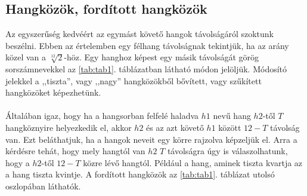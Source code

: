 \subsection{Hangközök, fordított hangközök}
\label{sec:hangkozok}
Az egyszerűség kedvéért az egymást követő  hangok távolságáról szoktunk beszélni. 
Ebben az értelemben egy félhang távolságnak tekintjük, ha az arány közel van a $\sqrt[12]{2}$-höz. 
Egy hanghoz képest egy másik távolságát görög sorszámnevekkel az \ref{tab:tab1}. 
táblázatban látható módon jelöljük. Módosító jelekkel a ,,tiszta'', vagy ,,nagy'' hangközökből bővített, vagy szűkített hangközöket képezhetünk. \\\\
Általában igaz, hogy ha a hangsorban felfelé haladva $h1$ nevű hang $h2$-től  $T$ hangköznyire helyezkedik el, 
akkor $h2$ és az azt követő $h1$ között $12-T$ távolság van. Ezt beláthatjuk, ha a hangok neveit egy körre rajzolva képzeljük el. 
Arra a kérdésre tehát, hogy mely hangtól van $h2$ $T$ távolságra úgy is válaszolhatunk, hogy a $h2$-től $12-T$ közre lévő hangtól. 
Például a hang, aminek tiszta kvartja \fisz az a \fisz hang tiszta kvintje. A fordított hangközök az \ref{tab:tab1}. táblázat utolsó oszlopában láthatók.
